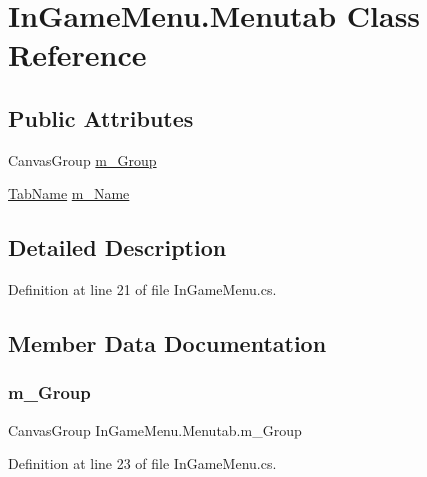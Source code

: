 \hypertarget{class_in_game_menu_1_1_menutab}{}\section{In\+Game\+Menu.\+Menutab Class Reference}
\label{class_in_game_menu_1_1_menutab}
\subsection*{Public Attributes}
\begin{DoxyCompactItemize}
\item 
Canvas\+Group \mbox{\hyperlink{class_in_game_menu_1_1_menutab_a7468aec41b1c1ccb86ef2799fdc3ca88}{m\+\_\+\+Group}}
\item 
\mbox{\hyperlink{_in_game_menu_8cs_a87eb828d74fde9afa783aa42bfe61b96}{Tab\+Name}} \mbox{\hyperlink{class_in_game_menu_1_1_menutab_a208628a2858d876c256ddf7b24e5eaf6}{m\+\_\+\+Name}}
\end{DoxyCompactItemize}


\subsection{Detailed Description}


Definition at line 21 of file In\+Game\+Menu.\+cs.



\subsection{Member Data Documentation}
\mbox{\label{class_in_game_menu_1_1_menutab_a7468aec41b1c1ccb86ef2799fdc3ca88}} 
\subsubsection{\texorpdfstring{m\+\_\+\+Group}{m\_Group}}
{\footnotesize\ttfamily Canvas\+Group In\+Game\+Menu.\+Menutab.\+m\+\_\+\+Group}



Definition at line 23 of file In\+Game\+Menu.\+cs.

\mbox{\label{class_in_game_menu_1_1_menutab_a208628a2858d876c256ddf7b24e5eaf6}} 
